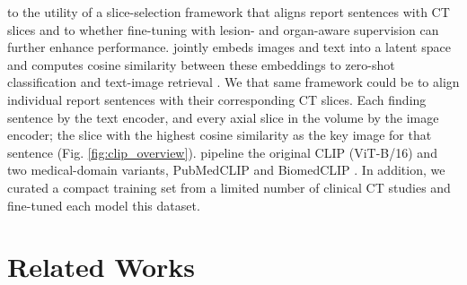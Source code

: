 \documentclass[bioengineering,article,submit,pdftex,moreauthors]{Definitions/mdpi}
\begin{document}
   to  the utility of a slice-selection framework that aligns report sentences with CT slices and to  whether fine-tuning with lesion- and organ-aware supervision can further enhance performance.
 jointly embeds images and text into a  latent space and computes cosine similarity between these embeddings to  zero-shot classiﬁcation and text-image retrieval \cite{radford_learning_2021}. 
We  that  same framework could be  to align individual report sentences with their corresponding CT slices. 
Each finding sentence   by the text encoder, and every axial slice in the volume   by the image encoder; the slice with the highest cosine similarity   as the key image for that sentence (Fig. \ref{fig:clip_overview}). 
 pipeline  the original CLIP (ViT-B/16) and two medical-domain variants, PubMedCLIP and BiomedCLIP \cite{radford_learning_2021,eslami_pubmedclip_2023,zhang_biomedclip_2025}. 
In addition, we curated a compact training set from a limited number of clinical CT studies and fine-tuned each model  this dataset. 




\section{Related Works}
\end{document}
